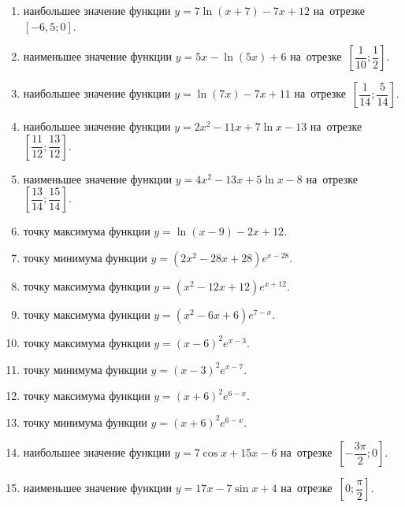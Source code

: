 \documentclass[a4paper,10pt]{article}
\begin{document}
\begin{enumerate}
\item {} наибольшее значение функции $y=7\ln \left(x+7\right)-7x+12$ на~отрезке~$\left[-6,5;0\right]$.

\item {} наименьшее значение функции $y=5x-\ln \left(5x\right)+6$ на~отрезке~$\left[\dfrac{1}{10};\dfrac{1}{2}\right]$.

\item {} наибольшее значение функции $y=\ln \left(7x\right)-7x+11$ на~отрезке~$\left[\dfrac{1}{14};\dfrac{5}{14}\right]$.

\item {} наибольшее значение функции $y=2x^2-11x+7\ln x-13$ на~отрезке~$\left[\dfrac{11}{12};\dfrac{13}{12}\right]$.

\item {} наименьшее значение функции $y=4x^2-13x+5\ln x-8$ на~отрезке~$\left[\dfrac{13}{14};\dfrac{15}{14}\right]$.

\item {} точку максимума функции $y=\ln \left(x-9\right)-2x+12$.

\item {} точку минимума функции $y=\left(2x^2-28x+28\right)e^{x-28}$.

\item {} точку максимума функции $y=\left(x^2-12x+12\right)e^{x+12}$.

\item {} точку максимума функции $y=\left(x^2-6x+6\right)e^{7-x}$.

\item {} точку максимума функции $y=\left(x-6\right)^2e^{x-3}$.

\item {} точку минимума функции $y=\left(x-3\right)^2e^{x-7}$.

\item {} точку максимума функции $y=\left(x+6\right)^2e^{6-x}$.

\item {} точку минимума функции $y=\left(x+6\right)^2e^{6-x}$.

\item {} наибольшее значение функции $y=7\cos x+15x-6$ на~отрезке~$\left[-\dfrac{3\pi }{2};0\right]$.

\item {} наименьшее значение функции $y=17x-7\sin x+4$ на~отрезке~$\left[0;\dfrac{\pi }{2}\right]$.


\end{enumerate}
\end{document}
